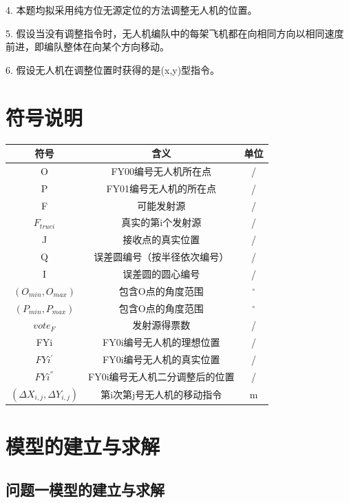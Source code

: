 \documentclass{ctexart}
\begin{document}
4. \quad 本题均拟采用纯方位无源定位的方法调整无人机的位置。

5. \quad 假设当没有调整指令时，无人机编队中的每架飞机都在向相同方向以相同速度前进，即编队整体在向某个方向移动。

6. \quad 假设无人机在调整位置时获得的是(x,y)型指令。

\section{符号说明}

\begin{table}[H]
  \centering
  \begin{tabular}{ccc}
  \toprule
  符号& 含义& 单位\\
  \midrule
  O&FY00编号无人机所在点&/\\
  P&FY01编号无人机的所在点&/\\
  F&可能发射源&/\\
  $F_{truei}$&真实的第i个发射源&/\\
  J&接收点的真实位置&/\\
  Q&误差圆编号（按半径依次编号）&/\\
  I&误差圆的圆心编号&/\\
  $(O_{min},O_{max})$&包含O点的角度范围&$^{\circ}$\\
  $(P_{min},P_{max})$&包含O点的角度范围&$^{\circ}$\\
  $vote_F$&发射源得票数&/\\
  FYi&FY0i编号无人机的理想位置&/\\
  $FYi^{'}$&FY0i编号无人机的真实位置&/\\
  $FYi^{''}$&FY0i编号无人机二分调整后的位置&/\\
  $(\Delta X_{i,j},\Delta Y_{i,j})$&第i次第j号无人机的移动指令&m\\
  \bottomrule
  \end{tabular}
  \end{table}




\section{模型的建立与求解}

\subsection{问题一模型的建立与求解}
\end{document}
